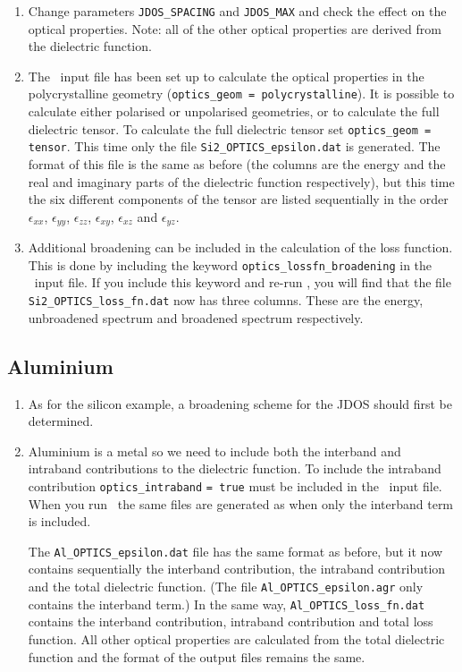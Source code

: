 \documentclass[a4paper,11pt,twoside]{book}
\begin{document}
{\begin{enumerate}
\item Change parameters \verb#JDOS_SPACING# and \verb#JDOS_MAX# and check the effect on the optical properties.  Note: all of the other optical properties are derived from the dielectric function.

\item  The \optados\ input file has been set up to calculate the optical properties in the polycrystalline geometry (\verb#optics_geom = polycrystalline#).  It is possible to calculate either polarised or unpolarised geometries, or to calculate the full dielectric tensor.  To calculate the full dielectric tensor set \verb#optics_geom = tensor#.  This time only the file \verb#Si2_OPTICS_epsilon.dat# is generated.  The format of this file is the same as before (the columns are the energy and the real and imaginary parts of the dielectric function respectively), but this time the six different components of the tensor are listed sequentially in the order $\epsilon_{xx}$, $\epsilon_{yy}$, $\epsilon_{zz}$, $\epsilon_{xy}$, $\epsilon_{xz}$ and $\epsilon_{yz}$.

\item Additional broadening can be included in the calculation of the loss function.  This is done by including the keyword \verb#optics_lossfn_broadening# in the \optados\ input file.  If you include this keyword and re-run \optados, you will find that the file \verb#Si2_OPTICS_loss_fn.dat# now has three columns.  These are the energy, unbroadened spectrum and broadened spectrum respectively.

\end{enumerate}

\subsection{Aluminium}
\begin{enumerate}
\item As for the silicon example, a broadening scheme for the JDOS should first be determined.
\item Aluminium is a metal so we need to include both the interband and intraband contributions to the dielectric function.  To include the intraband contribution \verb#optics_intraband# \verb#= true# must be included in the \optados\ input file.  When you run \optados\, the same files are generated as when only the interband term is included.

The \verb#Al_OPTICS_epsilon.dat# file has the same format as before, but it now contains sequentially the interband contribution, the intraband contribution and the total dielectric function.  (The file \verb#Al_OPTICS_epsilon.agr# only contains the interband term.)  In the same way, \verb#Al_OPTICS_loss_fn.dat# contains the interband contribution, intraband contribution and total loss function.  All other optical properties are calculated from the total dielectric function and the format of the output files remains the same.


\end{enumerate}}
\end{document}
